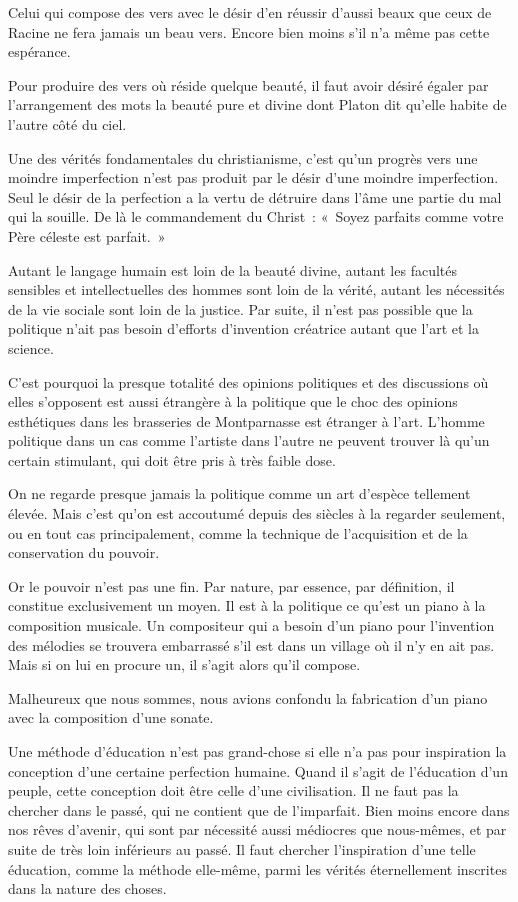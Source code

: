 \documentclass[french,twoside]{book} %
\begin{document}
Celui qui compose des vers avec le désir d'en réussir d'aussi beaux que ceux de Racine ne fera jamais un beau vers. Encore bien moins s'il n'a même pas cette espérance.\par
Pour produire des vers où réside quelque beauté, il faut avoir désiré égaler par l'arrangement des mots la beauté pure et divine dont Platon dit qu'elle habite de l'autre côté du ciel.\par
Une des vérités fondamentales du christianisme, c'est qu'un progrès vers une moindre imperfection n'est pas produit par le désir d'une moindre imperfection. Seul le désir de la perfection a la vertu de détruire dans l'âme une partie du mal qui la souille. De là le commandement du Christ : « Soyez parfaits comme votre Père céleste est parfait. »\par
Autant le langage humain est loin de la beauté divine, autant les facultés sensibles et intellectuelles des hommes sont loin de la vérité, autant les nécessités de la vie sociale sont loin de la justice. Par suite, il n'est pas possible que la politique n'ait pas besoin d'efforts d'invention créatrice autant que l'art et la science.\par
C'est pourquoi la presque totalité des opinions politiques et des discussions où elles s'opposent est aussi étrangère à la politique que le choc des opinions esthétiques dans les brasseries de Montparnasse est étranger à l'art. L'homme politique dans un cas comme l'artiste dans l'autre ne peuvent trouver là qu'un certain stimulant, qui doit être pris à très faible dose.\par
On ne regarde presque jamais la politique comme un art d'espèce tellement élevée. Mais c'est qu'on est accoutumé depuis des siècles à la regarder seulement, ou en tout cas principalement, comme la technique de l'acquisition et de la conservation du pouvoir.\par
Or le pouvoir n'est pas une fin. Par nature, par essence, par définition, il constitue exclusivement un moyen. Il est à la politique ce qu'est un piano à la composition musicale. Un compositeur qui a besoin d'un piano pour l'invention des mélodies se trouvera embarrassé s'il est dans un village où il n'y en ait pas. Mais si on lui en procure un, il s'agit alors qu'il compose.\par
Malheureux que nous sommes, nous avions confondu la fabrication d'un piano avec la composition d'une sonate.\par
Une méthode d'éducation n'est pas grand-chose si elle n'a pas pour inspiration la conception d'une certaine perfection humaine. Quand il s'agit de l'éducation d'un peuple, cette conception doit être celle d'une civilisation. Il ne faut pas la chercher dans le passé, qui ne contient que de l'imparfait. Bien moins encore dans nos rêves d'avenir, qui sont par nécessité aussi médiocres que nous-mêmes, et par suite de très loin inférieurs au passé. Il faut chercher l'inspiration d'une telle éducation, comme la méthode elle-même, parmi les vérités éternellement inscrites dans la nature des choses.\par
\end{document}
